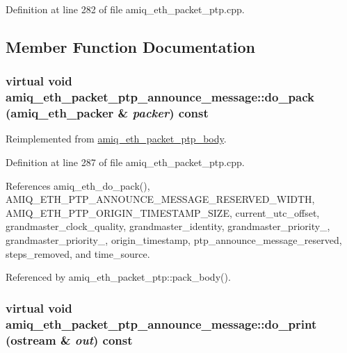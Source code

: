 Definition at line 282 of file amiq\_\-eth\_\-packet\_\-ptp.cpp.

\subsection{Member Function Documentation}
\hypertarget{classamiq__eth__packet__ptp__announce__message_a158d8eb0b4081bdfbce9d4b34be6daf7}{
\subsubsection[{do\_\-pack}]{\setlength{\rightskip}{0pt plus 5cm}virtual void amiq\_\-eth\_\-packet\_\-ptp\_\-announce\_\-message::do\_\-pack ({\bf amiq\_\-eth\_\-packer} \& {\em packer}) const}}
\label{classamiq__eth__packet__ptp__announce__message_a158d8eb0b4081bdfbce9d4b34be6daf7}


Reimplemented from \hyperlink{classamiq__eth__packet__ptp__body_a3df3ad9b3a4ef7ec42357565d44ede05}{amiq\_\-eth\_\-packet\_\-ptp\_\-body}.

Definition at line 287 of file amiq\_\-eth\_\-packet\_\-ptp.cpp.

References amiq\_\-eth\_\-do\_\-pack(), AMIQ\_\-ETH\_\-PTP\_\-ANNOUNCE\_\-MESSAGE\_\-RESERVED\_\-WIDTH, AMIQ\_\-ETH\_\-PTP\_\-ORIGIN\_\-TIMESTAMP\_\-SIZE, current\_\-utc\_\-offset, grandmaster\_\-clock\_\-quality, grandmaster\_\-identity, grandmaster\_\-priority\_, grandmaster\_\-priority\_, origin\_\-timestamp, ptp\_\-announce\_\-message\_\-reserved, steps\_\-removed, and time\_\-source.

Referenced by amiq\_\-eth\_\-packet\_\-ptp::pack\_\-body().\hypertarget{classamiq__eth__packet__ptp__announce__message_aba766be017b0eb4137a5fac7143c598b}{
\subsubsection[{do\_\-print}]{\setlength{\rightskip}{0pt plus 5cm}virtual void amiq\_\-eth\_\-packet\_\-ptp\_\-announce\_\-message::do\_\-print (ostream \& {\em out}) const}}
\label{classamiq__eth__packet__ptp__announce__message_aba766be017b0eb4137a5fac7143c598b}



